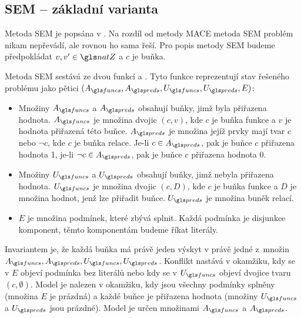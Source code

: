\subsection{SEM -- základní varianta}

Metoda SEM je popsána v \cite{zhang1995sem}.
Na rozdíl od metody MACE metoda SEM problém nikam nepřevádí, ale rovnou
ho sama řeší.
Pro popis metody SEM budeme předpokládat $v, v' \in \natZ$ a $c$ je buňka.

Metoda SEM sestává ze dvou funkcí  a .
Tyto funkce reprezentují stav řešeného problému jako
pětici $(A_\funcs, A_\preds, U_\funcs, U_\preds, E)$:


\begin{itemize}
\item Množiny $A_\funcs$ a $A_\preds$ obsahují buňky,
  jimž byla přiřazena hodnota. $A_\funcs$ je množina dvojic
  $(c, v)$, kde $c$ je buňka funkce a $v$
  je hodnota přiřazená této buňce. $A_\preds$ je množina
  jejíž prvky mají tvar $c$ nebo $\neg c$, kde $c$ je buňka
  relace. Je-li $c \in A_\preds$, pak je buňce $c$ přiřazena hodnota 1,
  je-li $\neg c \in A_\preds$, pak je buňce $c$ přiřazena hodnota 0.
\item Množiny $U_\funcs$ a $U_\preds$ obsahují buňky,
  jimž nebyla přiřazena hodnota. $U_\funcs$ je množina
  dvojic $(c, D)$, kde $c$ je buňka funkce a $D$
  je množina hodnot, jenž lze přiřadit buňce.
  $U_\preds$ je množina buněk relací.
\item $E$ je množina podmínek, které zbývá splnit.
  Každá podmínka je disjunkce komponent, těmto komponentám
  budeme říkat literály.
\end{itemize}
Invariantem je, že každá buňka má právě jeden výskyt
v právě jedné z~množin $A_\funcs, A_\preds, U_\funcs, U_\preds$.
Konflikt nastává v okamžiku, kdy se v $E$ objeví podmínka bez literálů
nebo kdy se v $U_\funcs$ objeví dvojice tvaru $(c, \emptyset)$.
Model je nalezen v okamžiku, kdy jsou všechny podmínky
splněny (množina $E$ je prázdná) a každé buňce je přiřazena
hodnota (množiny $U_\funcs$ a $U_\preds$ jsou prázdné).
Model je určen množinami $A_\funcs$ a $A_\preds$.

